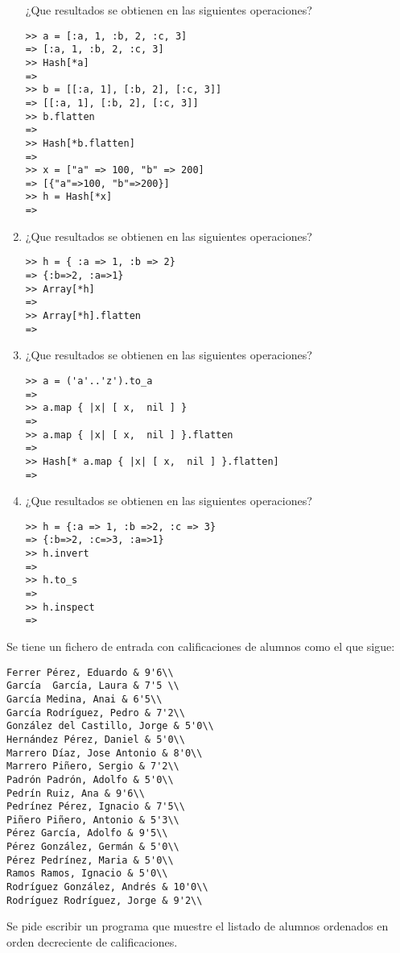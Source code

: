\begin{enumerate}
¿Que resultados se obtienen en las siguientes operaciones?
\begin{verbatim}
>> a = [:a, 1, :b, 2, :c, 3]
=> [:a, 1, :b, 2, :c, 3]
>> Hash[*a]
=> 
>> b = [[:a, 1], [:b, 2], [:c, 3]]
=> [[:a, 1], [:b, 2], [:c, 3]]
>> b.flatten
=> 
>> Hash[*b.flatten]
=> 
>> x = ["a" => 100, "b" => 200]
=> [{"a"=>100, "b"=>200}]
>> h = Hash[*x]
=> 
\end{verbatim}
\item
¿Que resultados se obtienen en las siguientes operaciones?
\begin{verbatim}
>> h = { :a => 1, :b => 2}
=> {:b=>2, :a=>1}
>> Array[*h]
=> 
>> Array[*h].flatten
=> 
\end{verbatim}
\item
¿Que resultados se obtienen en las siguientes operaciones?
\begin{verbatim}
>> a = ('a'..'z').to_a
=> 
>> a.map { |x| [ x,  nil ] }
=> 
>> a.map { |x| [ x,  nil ] }.flatten
=> 
>> Hash[* a.map { |x| [ x,  nil ] }.flatten]
=> 
\end{verbatim}
\item
¿Que resultados se obtienen en las siguientes operaciones?
\begin{verbatim}
>> h = {:a => 1, :b =>2, :c => 3}
=> {:b=>2, :c=>3, :a=>1}
>> h.invert
=> 
>> h.to_s
=> 
>> h.inspect
=> 
\end{verbatim}

\end{enumerate}

Se tiene un fichero de entrada con calificaciones de alumnos como el que sigue:
\begin{verbatim}
Ferrer Pérez, Eduardo & 9'6\\
García  García, Laura & 7'5 \\
García Medina, Anai & 6'5\\
García Rodríguez, Pedro & 7'2\\
González del Castillo, Jorge & 5'0\\
Hernández Pérez, Daniel & 5'0\\
Marrero Díaz, Jose Antonio & 8'0\\
Marrero Piñero, Sergio & 7'2\\
Padrón Padrón, Adolfo & 5'0\\
Pedrín Ruiz, Ana & 9'6\\
Pedrínez Pérez, Ignacio & 7'5\\
Piñero Piñero, Antonio & 5'3\\
Pérez García, Adolfo & 9'5\\
Pérez González, Germán & 5'0\\
Pérez Pedrínez, Maria & 5'0\\
Ramos Ramos, Ignacio & 5'0\\
Rodríguez González, Andrés & 10'0\\
Rodríguez Rodríguez, Jorge & 9'2\\
\end{verbatim}
Se pide escribir un programa que muestre el listado de alumnos ordenados
en orden decreciente de calificaciones.

